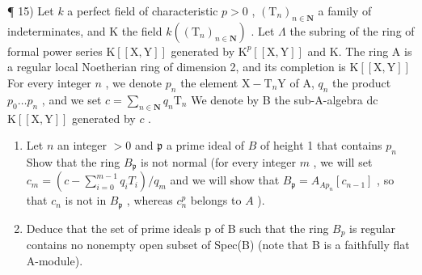 ¶ 15) Let \(k\) a perfect field of characteristic \(p > 0\) , \((\mathrm{T}_{n})_{n \in \mathbf{N}}\) a family of indeterminates, and K the field \(k((\mathrm{T}_{n})_{n \in \mathbf{N}})\) . Let \(\Lambda\) the subring of the ring of formal power series \(\mathrm{K}[[\mathrm{X},\mathrm{Y}]]\) generated by \(\mathrm{K}^{p}[[\mathrm{X},\mathrm{Y}]]\) and K. The ring A is a regular local Noetherian ring of dimension 2, and its completion is \(\mathrm{K}[[\mathrm{X},\mathrm{Y}]]\) For every integer \(n\) , we denote \(p_{n}\) the element \(\mathrm{X} - \mathrm{T}_{n}\mathrm{Y}\) of A, \(q_{n}\) the product \(p_{0} \ldots p_{n}\) , and we set \(c = \sum_{n \in \mathbf{N}} q_{n}\mathrm{T}_{n}\) We denote by B the sub-A-algebra dc \(\mathrm{K}[[\mathrm{X},\mathrm{Y}]]\) generated by \(c\) .

\begin{enumerate}
\def\labelenumi{\alph{enumi})}
\item
  Let \(n\) an integer \(> 0\) and \(\mathfrak{p}\) a prime ideal of \(B\) of height 1 that contains \(p_n\) Show that the ring \(B_{\mathfrak{p}}\) is not normal (for every integer \(m\) , we will set \(c_m = (c - \sum_{i=0}^{m-1} q_i T_i)/q_m\) and we will show that \(B_{\mathfrak{p}} = A_{A p_n}[c_{n-1}]\) , so that \(c_n\) is not in \(B_{\mathfrak{p}}\) , whereas \(c_n^p\) belongs to \(A\) ).
\item
  Deduce that the set of prime ideals p of B such that the ring \(B_{p}\) is regular contains no nonempty open subset of Spec(B) (note that B is a faithfully flat A-module).
\end{enumerate}

